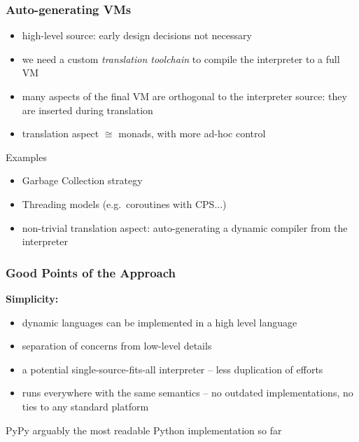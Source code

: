 \documentclass[utf8x]{beamer}
\begin{document}
\begin{frame}
  \frametitle{Auto-generating VMs}
  \begin{itemize}
  \item
    high-level source: early design decisions not necessary
  \item
    we need a custom \emph{translation toolchain} to compile the interpreter
    to a full VM
  \item
    many aspects of the final VM are orthogonal to the interpreter source:
    they are inserted during translation
  \item
    translation aspect $\cong$ monads, with more ad-hoc control
  \end{itemize}
  \pause
  \begin{block}{
    Examples}
    \begin{itemize}
    \item
      Garbage Collection strategy
    \item
      Threading models (e.g.\ coroutines with CPS...)
    \item
      non-trivial translation aspect: auto-generating a dynamic compiler from
      the interpreter
    \end{itemize}
  \end{block}
\end{frame}

\begin{frame}
  \frametitle{Good Points of the Approach}
  {\bf Simplicity:}

  \begin{itemize}
  \item
    dynamic languages can be implemented in a high level language
  \item
    separation of concerns from low-level details
  \item
    a potential single-source-fits-all interpreter --
    less duplication of efforts
  \item
    runs everywhere with the same semantics --
    no outdated implementations, no ties to any standard platform
  \end{itemize}
  \pause
  \begin{block}{PyPy}
     arguably the most readable Python implementation so far
  \end{block}
\end{frame}
\end{document}
